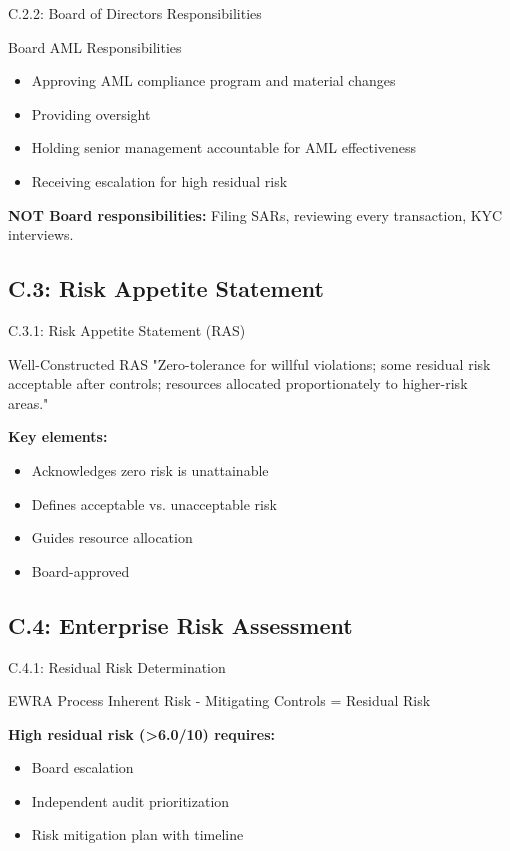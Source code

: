 \documentclass{beamer}
\begin{document}
	\begin{frame}{C.2.2: Board of Directors Responsibilities}
		\begin{block}{Board AML Responsibilities}
			\begin{itemize}
				\item Approving AML compliance program and material changes
				\item Providing oversight
				\item Holding senior management accountable for AML effectiveness
				\item Receiving escalation for high residual risk
			\end{itemize}
		\end{block}
		\textbf{NOT Board responsibilities:} Filing SARs, reviewing every transaction, KYC interviews.
	\end{frame}
	
	\subsection{C.3: Risk Appetite Statement}
	
	\begin{frame}{C.3.1: Risk Appetite Statement (RAS)}
		\begin{block}{Well-Constructed RAS}
			"Zero-tolerance for willful violations; some residual risk acceptable after controls; resources allocated proportionately to higher-risk areas."
		\end{block}
		\textbf{Key elements:}
		\begin{itemize}
			\item Acknowledges zero risk is unattainable
			\item Defines acceptable vs. unacceptable risk
			\item Guides resource allocation
			\item Board-approved
		\end{itemize}
	\end{frame}
	
	\subsection{C.4: Enterprise Risk Assessment}
	
	\begin{frame}{C.4.1: Residual Risk Determination}
		\begin{block}{EWRA Process}
			Inherent Risk - Mitigating Controls = Residual Risk
		\end{block}
		\textbf{High residual risk (>6.0/10) requires:}
		\begin{itemize}
			\item Board escalation
			\item Independent audit prioritization
			\item Risk mitigation plan with timeline
		\end{itemize}
	\end{frame}
	
\end{document}

